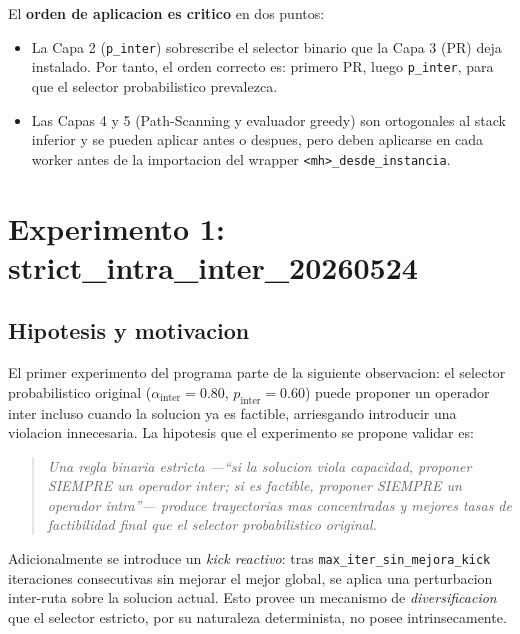 El \textbf{orden de aplicacion es critico} en dos puntos:

\begin{itemize}
\item La Capa 2 (\texttt{p\_inter}) sobrescribe el selector binario
  que la Capa 3 (PR) deja instalado. Por tanto, el orden correcto es:
  primero PR, luego \texttt{p\_inter}, para que el selector
  probabilistico prevalezca.
\item Las Capas 4 y 5 (Path-Scanning y evaluador greedy) son
  ortogonales al stack inferior y se pueden aplicar antes o despues,
  pero deben aplicarse en cada worker antes de la importacion del
  wrapper \texttt{<mh>\_desde\_instancia}.
\end{itemize}

\section{Experimento 1: strict\_intra\_inter\_20260524}
\label{sec:exp-strict}

\subsection{Hipotesis y motivacion}

El primer experimento del programa parte de la siguiente observacion:
el selector probabilistico original
($\alpha_{\text{inter}} = 0.80$, $p_{\text{inter}} = 0.60$) puede
proponer un operador inter incluso cuando la solucion ya es factible,
arriesgando introducir una violacion innecesaria. La hipotesis que el
experimento se propone validar es:

\begin{quote}
\textit{Una regla \emph{binaria estricta} ---``si la solucion viola
capacidad, proponer SIEMPRE un operador inter; si es factible, proponer
SIEMPRE un operador intra''--- produce trayectorias mas concentradas y
mejores tasas de factibilidad final que el selector probabilistico
original.}
\end{quote}

Adicionalmente se introduce un \emph{kick reactivo}: tras
\texttt{max\_iter\_sin\_mejora\_kick} iteraciones consecutivas sin
mejorar el mejor global, se aplica una perturbacion inter-ruta sobre
la solucion actual. Esto provee un mecanismo de \emph{diversificacion}
que el selector estricto, por su naturaleza determinista, no posee
intrinsecamente.

